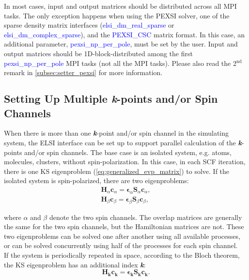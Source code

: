 \documentclass{report}
\begin{document}
\bigskip
In most cases, input and output matrices should be distributed across all MPI tasks.  The only exception happens when using the PEXSI solver, one of the sparse density matrix interfaces (\textcolor{blue}{elsi\_dm\_real\_sparse} or \textcolor{blue}{elsi\_dm\_complex\_sparse}), and the \textcolor{blue}{PEXSI\_CSC} matrix format.  In this case, an additional parameter, \textcolor{blue}{pexsi\_np\_per\_pole}, must be set by the user.  Input and output matrices should be 1D-block-distributed among the first \textcolor{blue}{pexsi\_np\_per\_pole} MPI tasks (not all the MPI tasks).  Please also read the 2$^\text{nd}$ remark in \ref{subsec:setter_pexsi} for more information.\\

\subsection{Setting Up Multiple \textbf{\textit{k}}-points and/or Spin Channels}
\label{subsec:setup_kpt}
When there is more than one \textbf{\textit{k}}-point and/or spin channel in the simulating system, the ELSI interface can be set up to support parallel calculation of the \textbf{\textit{k}}-points and/or spin channels.  The base case is an isolated system, e.g. atoms, molecules, clusters, without spin-polarization.  In this case, in each SCF iteration, there is one KS eigenproblem (\ref{eq:generalized_evp_matrix}) to solve.  If the isolated system is spin-polarized, there are two eigenproblems:\\
\begin{equation}
\label{eq:spin_evp}
\begin{split}
\boldsymbol{H}_\alpha \boldsymbol{c}_\alpha = \boldsymbol{\epsilon}_\alpha \boldsymbol{S}_\alpha \boldsymbol{c}_\alpha , \\
\boldsymbol{H}_\beta \boldsymbol{c}_\beta = \boldsymbol{\epsilon}_\beta \boldsymbol{S}_\beta \boldsymbol{c}_\beta ,
\end{split}
\end{equation}

where $\alpha$ and $\beta$ denote the two spin channels.  The overlap matrices are generally the same for the two spin channels, but the Hamiltonian matrices are not.  These two eigenproblems can be solved one after another using all available processes, or can be solved concurrently using half of the processes for each spin channel.\\

If the system is periodically repeated in space, according to the Bloch theorem, the KS eigenproblem has an additional index \textbf{\textit{k}}:\\
\begin{equation}
\label{eq:kpt_evp}
\boldsymbol{H}_{\boldsymbol{k}} \boldsymbol{c}_{\boldsymbol{k}} = \boldsymbol{\epsilon}_{\boldsymbol{k}} \boldsymbol{S}_{\boldsymbol{k}} \boldsymbol{c}_{\boldsymbol{k}} .
\end{equation}
\end{document}
